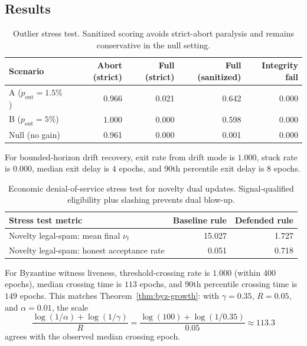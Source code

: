 \documentclass[11pt,a4paper]{article}
\begin{document}
\subsection{Results}
\begin{table}[H]
\centering
\small
\begin{tabular}{lrrrr}
\toprule
Scenario & Abort (strict) & Full (strict) & Full (sanitized) & Integrity fail \\
\midrule
A ($p_{\mathrm{out}}=1.5\%$) & 0.966 & 0.021 & 0.642 & 0.000 \\
B ($p_{\mathrm{out}}=5\%$) & 1.000 & 0.000 & 0.598 & 0.000 \\
Null (no gain) & 0.961 & 0.000 & 0.001 & 0.000 \\
\bottomrule
\end{tabular}
\caption{Outlier stress test. Sanitized scoring avoids strict-abort paralysis and remains conservative in the null setting.}
\end{table}

For bounded-horizon drift recovery, exit rate from drift mode is $1.000$, stuck rate is $0.000$, median exit delay is $4$ epochs, and 90th percentile exit delay is $8$ epochs.

\begin{table}[H]
\centering
\small
\begin{tabular}{lrr}
\toprule
Stress test metric & Baseline rule & Defended rule \\
\midrule
Novelty legal-spam: mean final $\nu_t$ & 15.027 & 1.727 \\
Novelty legal-spam: honest acceptance rate & 0.051 & 0.718 \\
\bottomrule
\end{tabular}
\caption{Economic denial-of-service stress test for novelty dual updates. Signal-qualified eligibility plus slashing prevents dual blow-up.}
\end{table}

For Byzantine witness liveness, threshold-crossing rate is $1.000$ (within 400 epochs), median crossing time is $113$ epochs, and 90th percentile crossing time is $149$ epochs.
This matches Theorem~\ref{thm:byz-growth}: with $\gamma=0.35$, $R=0.05$, and $\alpha=0.01$, the scale
\[
\frac{\log(1/\alpha)+\log(1/\gamma)}{R}
=\frac{\log(100)+\log(1/0.35)}{0.05}\approx 113.3
\]
agrees with the observed median crossing epoch.
\end{document}
